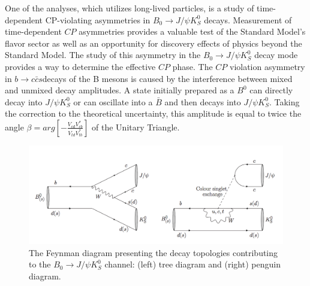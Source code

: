 One of the analyses, which utilizes long-lived particles, is a study of time-dependent CP-violating asymmetries in $B_0 \rightarrow J/\psi K_S^0 $ decays. Measurement of time-dependent $CP$ asymmetries provides a valuable test of the Standard Model's flavor sector as well as an opportunity for discovery effects of physics beyond the Standard Model.  
 The study of this asymmetry in the $B_0 \rightarrow J/\psi K_S^0 $  decay mode provides a way to determine the effective $CP$ phase. The $CP$ violation asymmetry in $b \rightarrow c\bar{c}s$decays of the B mesons is caused by the interference between mixed and unmixed decay amplitudes.
 A state initially prepared as a $B^0$ can directly decay into $J/\psi K_S^0$ or can oscillate into a $\bar{B}$ and then decays into  $J/\psi K_S^0$. Taking the correction to the theoretical uncertainty, this amplitude is equal to twice the angle $\beta = arg [ -  \frac{V_{cd}V_{cb}^*}{V_{td}V_{tb}^*} ] $ of the Unitary Triangle. 


\begin{figure}[h]
\centering
\includegraphics[scale=0.9]{figures/B0JPKs.png}
\caption{The Feynman diagram presenting the decay topologies contributing to the $B_0 \rightarrow J/\psi K_S^0 $ channel:  (left) tree diagram and (right) penguin diagram.
\label{fig:BJPSi}}
\end{figure}

